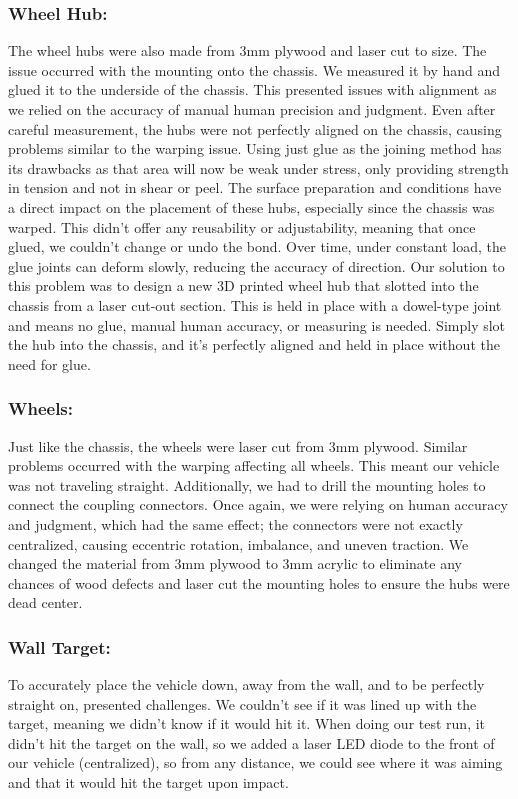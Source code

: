 \documentclass{article}
\begin{document}
\subsubsection{Wheel Hub:}
The wheel hubs were also made from 3mm plywood and laser cut to size. The issue occurred with the mounting onto the chassis. We measured it by hand and glued it to the underside of the chassis. This presented issues with alignment as we relied on the accuracy of manual human precision and judgment. Even after careful measurement, the hubs were not perfectly aligned on the chassis, causing problems similar to the warping issue. Using just glue as the joining method has its drawbacks as that area will now be weak under stress, only providing strength in tension and not in shear or peel. The surface preparation and conditions have a direct impact on the placement of these hubs, especially since the chassis was warped. This didn't offer any reusability or adjustability, meaning that once glued, we couldn't change or undo the bond. Over time, under constant load, the glue joints can deform slowly, reducing the accuracy of direction. Our solution to this problem was to design a new 3D printed wheel hub that slotted into the chassis from a laser cut-out section. This is held in place with a dowel-type joint and means no glue, manual human accuracy, or measuring is needed. Simply slot the hub into the chassis, and it's perfectly aligned and held in place without the need for glue.

\subsubsection{Wheels:}
Just like the chassis, the wheels were laser cut from 3mm plywood. Similar problems occurred with the warping affecting all wheels. This meant our vehicle was not traveling straight. Additionally, we had to drill the mounting holes to connect the coupling connectors. Once again, we were relying on human accuracy and judgment, which had the same effect; the connectors were not exactly centralized, causing eccentric rotation, imbalance, and uneven traction. We changed the material from 3mm plywood to 3mm acrylic to eliminate any chances of wood defects and laser cut the mounting holes to ensure the hubs were dead center.

\subsubsection{Wall Target:}
To accurately place the vehicle down, away from the wall, and to be perfectly straight on, presented challenges. We couldn't see if it was lined up with the target, meaning we didn't know if it would hit it. When doing our test run, it didn't hit the target on the wall, so we added a laser LED diode to the front of our vehicle (centralized), so from any distance, we could see where it was aiming and that it would hit the target upon impact.
\end{document}
